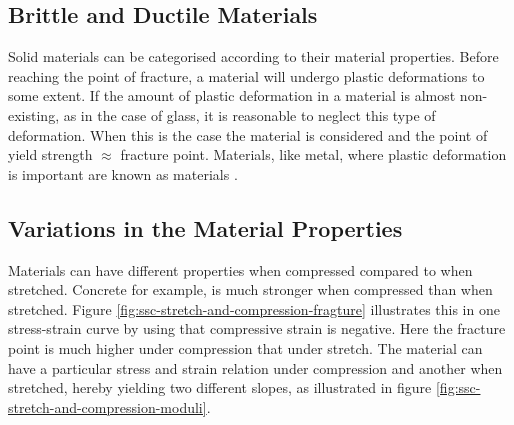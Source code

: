 \subsection{Brittle and Ductile Materials}
\label{sec:brittle-ductile}
Solid materials can be categorised according to their material
properties. Before reaching the point of fracture, a material will
undergo plastic deformations to some extent.
%
If the amount of plastic deformation in a material is almost
non-existing, as in the case of glass, it is reasonable to neglect
this type of deformation. When this is the case the material is
considered  and the point of yield strength $\approx$
fracture point.
%
Materials, like metal, where plastic deformation is important are
known as  materials .
%



\subsection{Variations in the Material Properties}
Materials can have different properties when compressed compared
to when stretched. Concrete for example, is much stronger
when compressed than when stretched. Figure
\vref{fig:ssc-stretch-and-compression-fragture} illustrates this in one
stress-strain curve by using that compressive strain is negative. Here
the fracture point is much higher under compression that under
stretch.
%
The material can have a particular stress and strain relation under compression
and another when stretched, hereby yielding two different slopes, as
illustrated in figure \vref{fig:ssc-stretch-and-compression-moduli}.
%

